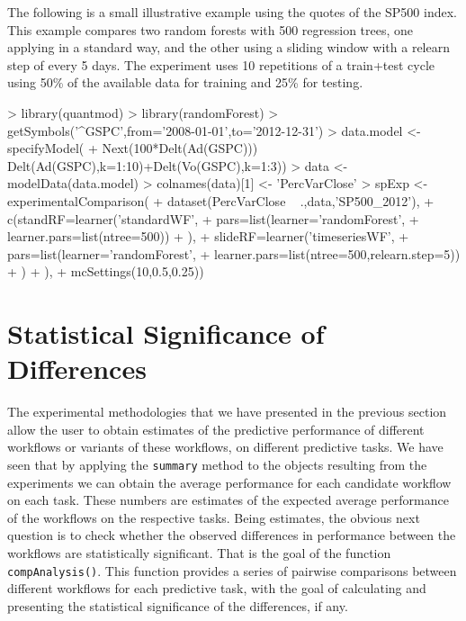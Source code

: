 \documentclass[10pt,a4paper]{article}
\begin{document}
The following is a small illustrative example using the quotes of the
SP500 index. This example compares two random forests with 500
regression trees, one applying in a standard way, and the other using
a sliding window with a relearn step of every 5 days. The experiment
uses 10 repetitions of a train+test cycle using 50\% of the available
data for training and 25\% for testing.

\begin{Schunk}
\begin{Sinput}
> library(quantmod)
> library(randomForest)
> getSymbols('^GSPC',from='2008-01-01',to='2012-12-31')
> data.model <- specifyModel(
+   Next(100*Delt(Ad(GSPC))) ~ Delt(Ad(GSPC),k=1:10)+Delt(Vo(GSPC),k=1:3))
> data <- modelData(data.model)
> colnames(data)[1] <- 'PercVarClose'
> spExp <- experimentalComparison(
+   dataset(PercVarClose ~ .,data,'SP500_2012'),
+   c(standRF=learner('standardWF',
+                     pars=list(learner='randomForest',
+                               learner.pars=list(ntree=500))
+                    ),
+     slideRF=learner('timeseriesWF',
+                     pars=list(learner='randomForest',
+                               learner.pars=list(ntree=500,relearn.step=5))
+                    )
+     ),
+   mcSettings(10,0.5,0.25))
\end{Sinput}
\end{Schunk}



\section{Statistical Significance of Differences}

The experimental methodologies that we have presented in the previous
section allow the user to obtain estimates of the predictive
performance of different workflows or variants of these workflows, on
different predictive tasks. We have seen that by applying the
\texttt{summary} method to the objects resulting from the experiments
we can obtain the average performance for each candidate workflow on
each task. These numbers are estimates of the expected average
performance of the workflows on the respective tasks. Being estimates,
the obvious next question is to check whether the observed differences
in performance between the workflows are statistically
significant. That is the goal of the function
\texttt{compAnalysis()}. This function provides a series of pairwise
comparisons between different workflows for each predictive task, with
the goal of calculating and presenting the statistical significance of
the differences, if any.
\end{document}
